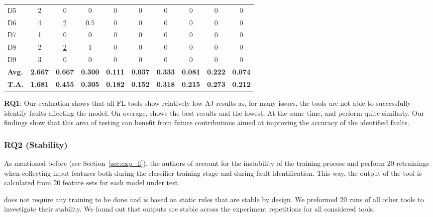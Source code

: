 \begin{table}[ht]
{\begin{tabular}{l|c|cc|cc|cc|cc}
D5 & 2 & 0 & 0 & 0 & 0 & 0 & 0 & 0 & 0  \\
D6 & 4 & \underline{2} & 0.5 & 0 & 0 & 0 & 0 & 0 & 0  \\
D7 & 1 & 0 & 0 & 0 & 0 & 0 & 0 & 0 & 0  \\
D8 & 2 & \underline{2} & 1 & 0 & 0 & 0 & 0 & 0 & 0  \\
D9 & 3 & 0 & 0 & 0 & 0 & 0 & 0 & 0 & 0  \\
    \midrule
\textbf{Avg.} & \textbf{2.667} & \textbf{0.667} & \textbf{0.300} & \textbf{0.111} & \textbf{0.037} & \textbf{0.333} & \textbf{0.081} & \textbf{0.222} & \textbf{0.074} \\ 			
    \midrule
\textbf{T.A.} & \textbf{1.681} & \textbf{0.455} & \textbf{0.305} & \textbf{0.182} & \textbf{0.152} & \textbf{0.318} & \textbf{0.215} & \textbf{0.273} & \textbf{0.212} \\
    \bottomrule
  \end{tabular}
  }
\end{table}

\begin{tcolorbox}[colback = box-white]
  \textbf{RQ1}: Our evaluation shows that all FL tools show relatively low AJ results as, for many issues, the tools are not able to successfully identify faults affecting the model. On average, \dfd shows the best results and \DD the lowest. At the same time, \NL and \UM perform quite similarly. Our findings show that this area of testing can benefit from future contributions aimed at improving the accuracy of the identified faults.
\end{tcolorbox}

\subsubsection{RQ2 (Stability)}

As mentioned before (see Section~\ref{sec:exp_fl}), the authors of \dfd account for the instability of the training process and perform 20 retrainings when collecting input features both during the classifier training stage and during fault identification. This way, the output of the tool is calculated from 20 feature sets for each model under test.

\NL does not require any training to be done and is based on static rules that are stable by design. We preformed 20 runs of all other tools to investigate their stability. We found out that outputs are stable across the experiment repetitions for all considered tools.



